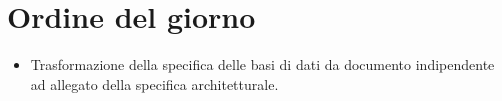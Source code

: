 \section{Ordine del giorno}

\begin{itemize}
    \item Trasformazione della specifica delle basi di dati da documento indipendente ad allegato della specifica architetturale.
\end{itemize}